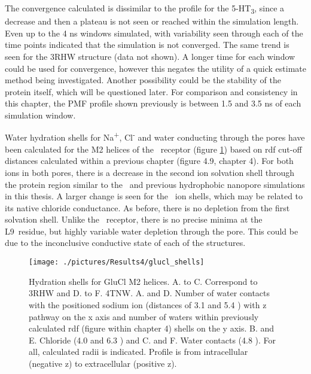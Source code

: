 The convergence calculated is dissimilar to the profile for the 5-HT\textsubscript{3}, since a decrease and then a plateau is not seen or reached within the simulation length. Even up to the 4 ns windows simulated, with variability seen through each of the time points indicated that the simulation is not converged. The same trend is seen for the 3RHW structure (data not shown).  A longer time for each window could be used for convergence, however this negates the utility of a quick estimate method being investigated. Another possibility could be the stability of the protein itself, which will be questioned later. For comparison and consistency in this chapter, the PMF profile shown previously is between 1.5 and 3.5 ns of each simulation window.

Water hydration shells for Na\textsuperscript{+}, Cl\textsuperscript{-} and water conducting through the pores have been calculated for the M2 helices of the \gl\ receptor (figure \ref{fig:glucl_shells}) based on rdf cut-off distances calculated within a previous chapter (figure 4.9, chapter 4). For both ions in both pores, there is a decrease in the second ion solvation shell through the protein region similar to the \HT\ and previous hydrophobic nanopore simulations in this thesis. A larger change is seen for the \Cl\ ion shells, which may be related to its native chloride conductance. As before, there is no depletion from the first solvation shell. Unlike the \HT\ receptor, there is no precise minima at the L9\textquotesingle\ residue, but highly variable water depletion through the pore. This could be due to the inconclusive conductive state of each of the structures. 

\begin{figure}[H]
\begin{center}
\texttt{[image: ./pictures/Results4/glucl\_shells]}
\caption[Hydration shells for GluCl M2 helices.] {Hydration shells for GluCl M2 helices. A. to C. Correspond to 3RHW and D. to F. 4TNW. A. and D. Number of water contacts with the positioned sodium ion (distances of 3.1 and 5.4 \angstrom) with z pathway on the x axis and number of waters within previously calculated rdf (figure within chapter 4) shells on the y axis. B. and E. Chloride (4.0 and 6.3 \angstrom) and C. and F. Water contacts (4.8 \angstrom). For all, calculated radii is indicated. Profile is from intracellular (negative z) to extracellular (positive z).} %
\label{fig:glucl_shells}
\end{center}
\end{figure}

